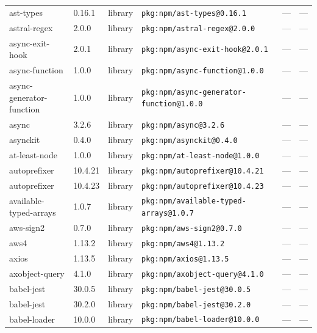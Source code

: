 \documentclass[11pt,a4paper]{article}
\begin{document}
\begin{longtable}{|p{4cm}|p{2cm}|p{1.6cm}|p{5cm}|p{1.5cm}|p{3.5cm}|}
\raggedright ast-types & 0.16.1 & library & \small\texttt{pkg:npm/ast-types@0.16.1} & — & \small — \\
\raggedright astral-regex & 2.0.0 & library & \small\texttt{pkg:npm/astral-regex@2.0.0} & — & \small — \\
\raggedright async-exit-hook & 2.0.1 & library & \small\texttt{pkg:npm/async-exit-hook@2.0.1} & — & \small — \\
\raggedright async-function & 1.0.0 & library & \small\texttt{pkg:npm/async-function@1.0.0} & — & \small — \\
\raggedright async-generator-function & 1.0.0 & library & \small\texttt{pkg:npm/async-generator-function@1.0.0} & — & \small — \\
\raggedright async & 3.2.6 & library & \small\texttt{pkg:npm/async@3.2.6} & — & \small — \\
\raggedright asynckit & 0.4.0 & library & \small\texttt{pkg:npm/asynckit@0.4.0} & — & \small — \\
\raggedright at-least-node & 1.0.0 & library & \small\texttt{pkg:npm/at-least-node@1.0.0} & — & \small — \\
\raggedright autoprefixer & 10.4.21 & library & \small\texttt{pkg:npm/autoprefixer@10.4.21} & — & \small — \\
\raggedright autoprefixer & 10.4.23 & library & \small\texttt{pkg:npm/autoprefixer@10.4.23} & — & \small — \\
\raggedright available-typed-arrays & 1.0.7 & library & \small\texttt{pkg:npm/available-typed-arrays@1.0.7} & — & \small — \\
\raggedright aws-sign2 & 0.7.0 & library & \small\texttt{pkg:npm/aws-sign2@0.7.0} & — & \small — \\
\raggedright aws4 & 1.13.2 & library & \small\texttt{pkg:npm/aws4@1.13.2} & — & \small — \\
\raggedright axios & 1.13.5 & library & \small\texttt{pkg:npm/axios@1.13.5} & — & \small — \\
\raggedright axobject-query & 4.1.0 & library & \small\texttt{pkg:npm/axobject-query@4.1.0} & — & \small — \\
\raggedright babel-jest & 30.0.5 & library & \small\texttt{pkg:npm/babel-jest@30.0.5} & — & \small — \\
\raggedright babel-jest & 30.2.0 & library & \small\texttt{pkg:npm/babel-jest@30.2.0} & — & \small — \\
\raggedright babel-loader & 10.0.0 & library & \small\texttt{pkg:npm/babel-loader@10.0.0} & — & \small — \\

\end{longtable}
\end{document}
